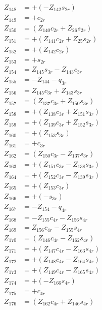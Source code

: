 \begin{multicols}{2}
\begin{align}
Z_{148} &= + (-Z_{142}s_{2r}) \nonumber \\
Z_{149} &= + c_{2r} \nonumber \\
Z_{150} &= (Z_{140}c_{2r} + Z_{26}s_{2r}) \nonumber \\
Z_{151} &= + (Z_{141}c_{2r} + Z_{25}s_{2r}) \nonumber \\
Z_{152} &= + (Z_{142}c_{2r}) \nonumber \\
Z_{153} &= + s_{2r} \nonumber \\
Z_{154} &= Z_{145}s_{3r} - Z_{143}c_{3r} \nonumber \\
Z_{155} &=                 - Z_{144} - \dot{q}_{3r} \nonumber \\
Z_{156} &= Z_{145}c_{3r} + Z_{143}s_{3r} \nonumber \\
Z_{157} &= (Z_{137}c_{3r} + Z_{150}s_{3r}) \nonumber \\
Z_{158} &= + (Z_{138}c_{3r} + Z_{151}s_{3r}) \nonumber \\
Z_{159} &= + (Z_{139}c_{3r} + Z_{152}s_{3r}) \nonumber \\
Z_{160} &= + (Z_{153}s_{3r}) \nonumber \\ 
Z_{161} &= + c_{3r} \nonumber \\
Z_{162} &= (Z_{150}c_{3r} - Z_{137}s_{3r}) \nonumber \\ 
Z_{163} &= + (Z_{151}c_{3r} - Z_{138}s_{3r}) \nonumber \\
Z_{164} &= + (Z_{152}c_{3r} - Z_{139}s_{3r}) \nonumber \\
Z_{165} &= + (Z_{153}c_{3r}) \nonumber \\ 
Z_{166} &= + (-s_{3r}) \nonumber \\
Z_{167} &=                   - Z_{154} - \dot{q}_{4r} \nonumber \\
Z_{168} &= - Z_{155}c_{4r} - Z_{156}s_{4r} \nonumber \\
Z_{169} &=   Z_{156}c_{4r} - Z_{155}s_{4r} \nonumber \\
Z_{170} &= (Z_{146}c_{4r} - Z_{162}s_{4r}) \nonumber \\ 
Z_{171} &= + (Z_{147}c_{4r} - Z_{163}s_{4r}) \nonumber \\
Z_{172} &= + (Z_{148}c_{4r} - Z_{164}s_{4r}) \nonumber \\
Z_{173} &= + (Z_{149}c_{4r} - Z_{165}s_{4r}) \nonumber \\
Z_{174} &= + (-Z_{166}s_{4r}) \nonumber \\ 
Z_{175} &= + c_{4r} \nonumber \\
Z_{176} &= (Z_{162}c_{4r} + Z_{146}s_{4r}) \nonumber \\

\end{align}
\end{multicols}
